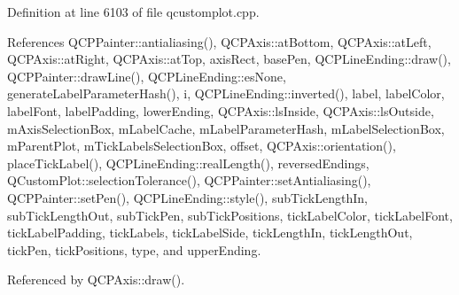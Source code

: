 Definition at line 6103 of file qcustomplot.\+cpp.



References Q\+C\+P\+Painter\+::antialiasing(), Q\+C\+P\+Axis\+::at\+Bottom, Q\+C\+P\+Axis\+::at\+Left, Q\+C\+P\+Axis\+::at\+Right, Q\+C\+P\+Axis\+::at\+Top, axis\+Rect, base\+Pen, Q\+C\+P\+Line\+Ending\+::draw(), Q\+C\+P\+Painter\+::draw\+Line(), Q\+C\+P\+Line\+Ending\+::es\+None, generate\+Label\+Parameter\+Hash(), i, Q\+C\+P\+Line\+Ending\+::inverted(), label, label\+Color, label\+Font, label\+Padding, lower\+Ending, Q\+C\+P\+Axis\+::ls\+Inside, Q\+C\+P\+Axis\+::ls\+Outside, m\+Axis\+Selection\+Box, m\+Label\+Cache, m\+Label\+Parameter\+Hash, m\+Label\+Selection\+Box, m\+Parent\+Plot, m\+Tick\+Labels\+Selection\+Box, offset, Q\+C\+P\+Axis\+::orientation(), place\+Tick\+Label(), Q\+C\+P\+Line\+Ending\+::real\+Length(), reversed\+Endings, Q\+Custom\+Plot\+::selection\+Tolerance(), Q\+C\+P\+Painter\+::set\+Antialiasing(), Q\+C\+P\+Painter\+::set\+Pen(), Q\+C\+P\+Line\+Ending\+::style(), sub\+Tick\+Length\+In, sub\+Tick\+Length\+Out, sub\+Tick\+Pen, sub\+Tick\+Positions, tick\+Label\+Color, tick\+Label\+Font, tick\+Label\+Padding, tick\+Labels, tick\+Label\+Side, tick\+Length\+In, tick\+Length\+Out, tick\+Pen, tick\+Positions, type, and upper\+Ending.



Referenced by Q\+C\+P\+Axis\+::draw().


